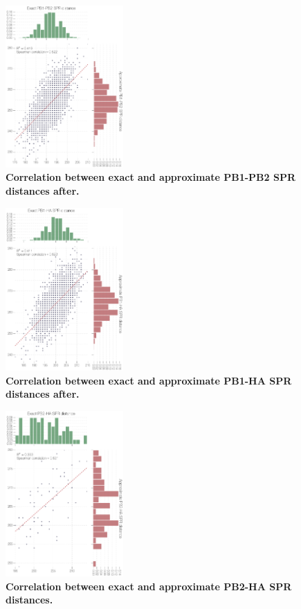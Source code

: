 \documentclass[11pt,oneside,letterpaper]{article}
\begin{document}
\begin{figure}
\centering  
\includegraphics[width=0.4\textwidth]  {supp_figures/InfB_supp_PB1-PB2_corr.png}
\caption{\textbf{Correlation between exact and approximate PB1-PB2 SPR distances after.}}
\label{SPR_PB1-PB2_correlation}
\end{figure}

\begin{figure}
\centering  
\includegraphics[width=0.4\textwidth]  {supp_figures/InfB_supp_PB1-HA_corr.png}
\caption{\textbf{Correlation between exact and approximate PB1-HA SPR distances after.}}
\label{SPR_PB1-HA_correlation}
\end{figure}

\begin{figure}
\centering  
\includegraphics[width=0.4\textwidth]  {supp_figures/InfB_supp_PB2-HA_corr.png}
\caption{\textbf{Correlation between exact and approximate PB2-HA SPR distances.}}
\label{SPR_PB2-HA_correlation}
\end{figure}
\end{document}
